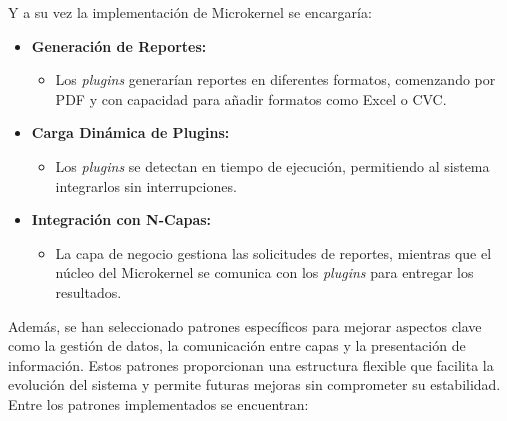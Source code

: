 \documentclass{report}
\begin{document}
    Y a su vez la implementación de Microkernel se encargaría:

    \begin{itemize}
        \item \textbf{Generación de Reportes:}
        \begin{itemize}
            \item Los \textit{plugins} generarían reportes en diferentes formatos, comenzando por PDF y con capacidad para añadir formatos como Excel o CVC.
        \end{itemize}

        \item \textbf{Carga Dinámica de Plugins:}
        \begin{itemize}
            \item Los \textit{plugins} se detectan en tiempo de ejecución, permitiendo al sistema integrarlos sin interrupciones.
        \end{itemize}

        \item \textbf{Integración con N-Capas:}
        \begin{itemize}
            \item La capa de negocio gestiona las solicitudes de reportes, mientras que el núcleo del Microkernel se comunica con los \textit{plugins} para entregar los resultados.
        \end{itemize}
    \end{itemize}

    Además, se han seleccionado patrones específicos para mejorar aspectos clave como la gestión de datos, la comunicación entre capas y la presentación de información. 
    Estos patrones proporcionan una estructura flexible que facilita la evolución del sistema y permite futuras mejoras sin comprometer su estabilidad. \\

    Entre los patrones implementados se encuentran:
\end{document}
